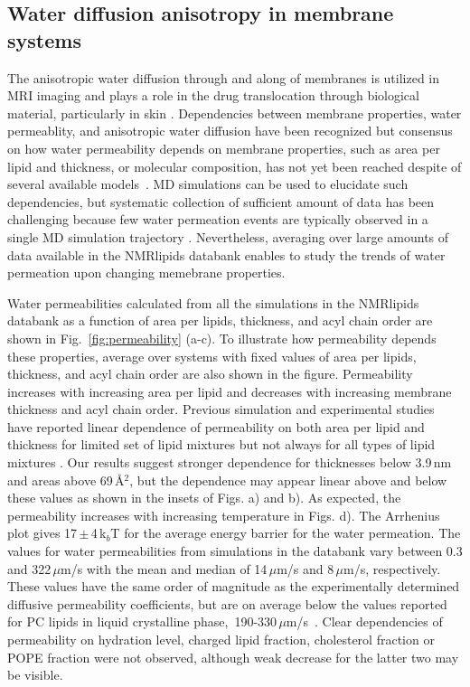 \documentclass[fleqn,10pt]{wlscirep}
\begin{document}
\subsection{Water diffusion anisotropy in membrane systems}
The anisotropic water diffusion through and along of membranes is utilized in MRI imaging \cite{??} and plays a role in the drug translocation through biological material, particularly in skin \cite{hansen13,wen18,nitsche19,roberts21,??}. Dependencies between membrane properties, water permeablity, and anisotropic water diffusion have been recognized \cite{??} but consensus on how water permeability depends on membrane properties, such as area per lipid and thickness, or molecular composition, has not yet been reached despite of several available models~\cite{nitsche13,nitsche16,shinoda16,venable19,??}. MD simulations can be used to elucidate such dependencies, but systematic collection of sufficient amount of data has been challenging because few water permeation events are typically observed in a single MD simulation trajectory \cite{??}. Nevertheless, averaging over large amounts of data available in the NMRlipids databank enables to study the trends of water permeation upon changing memebrane properties.

Water permeabilities calculated from all the simulations in the NMRlipids databank as a function of area per lipids, thickness, and acyl chain order are shown in  Fig.~\ref{fig:permeability} (a-c). To illustrate how permeability depends these properties, average over systems with fixed values of area per lipids, thickness, and acyl chain order are also shown in the figure. Permeability increases with increasing area per lipid and decreases with increasing membrane thickness and acyl chain order. Previous simulation and experimental studies have reported linear dependence of permeability on both area per lipid and thickness for limited set of lipid mixtures but not always for all types of lipid mixtures \cite{mathai08,frallicciardi22}. Our results suggest stronger dependence for thicknesses below 3.9\,nm and areas above 69\,Å$^2$, but the dependence may appear linear above and below these values as shown in the insets of Figs. \label{fig:permeability} a) and b). As expected, the permeability increases with increasing temperature in Figs. \label{fig:permeability} d). The Arrhenius plot gives 17\,$\pm$\,4\,k$_b$T for the average energy barrier for the water permeation. The values for water permeabilities from simulations in the databank vary between 0.3 and 322\,$\mu$m/s with the mean and median of 14\,$\mu$m/s and 8\,$\mu$m/s, respectively. These values have the same order of magnitude as the experimentally determined diffusive permeability coefficients, but are on average below the values reported for PC lipids in liquid crystalline phase,~190-330\,$\mu$m/s~\cite{jansen95}. 
Clear dependencies of permeability on hydration level, charged lipid fraction, cholesterol fraction or POPE fraction were not observed, although weak decrease for the latter two may be visible.
\end{document}

